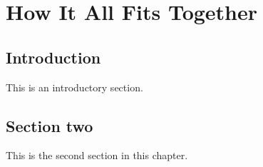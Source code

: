 \chapter{How It All Fits Together}
\label{ch:over}


\section{Introduction}
\label{over:s:intro}

This is an introductory section.

\section{Section two}

This is the second section in this chapter.
